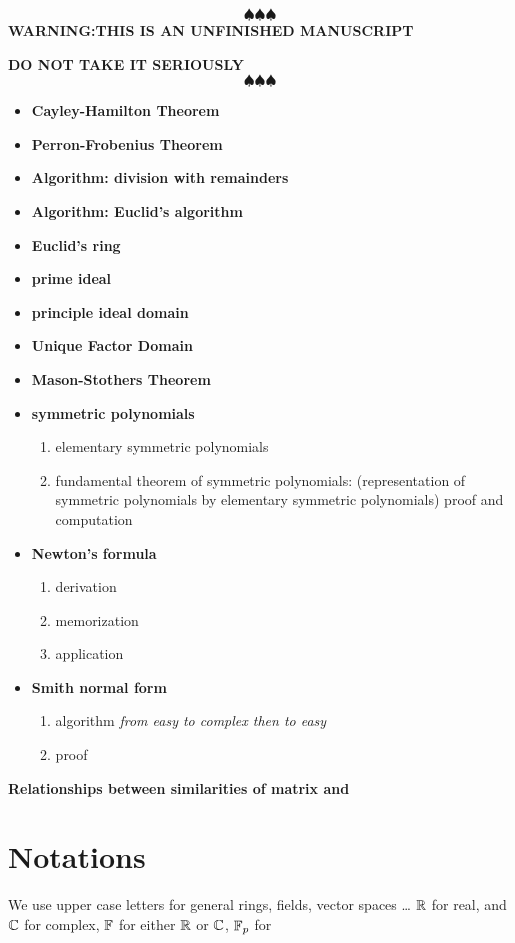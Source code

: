 \documentclass{book}
\begin{document}
\[\spadesuit\spadesuit\spadesuit\]
\textbf{WARNING:THIS IS AN UNFINISHED MANUSCRIPT}\par
\textbf{DO NOT TAKE IT SERIOUSLY}
\[\spadesuit\spadesuit\spadesuit\]
\begin{itemize}
\item \textbf{Cayley-Hamilton Theorem}
\item \textbf{Perron-Frobenius Theorem}
\item \textbf{Algorithm: division with remainders}
\item \textbf{Algorithm: Euclid's algorithm}
\item \textbf{Euclid's ring}
\item \textbf{prime ideal}
\item \textbf{principle ideal domain}
\item \textbf{Unique Factor Domain}
\item \textbf{Mason-Stothers Theorem} 
\item \textbf{symmetric polynomials}
\begin{enumerate}
    \item elementary symmetric polynomials
    \item fundamental theorem of symmetric polynomials: (representation of symmetric polynomials by elementary symmetric polynomials) proof and computation
\end{enumerate}
\item \textbf{Newton's formula} 
\begin{enumerate}
    \item derivation
    \item memorization
    \item application
\end{enumerate}
\item \textbf{Smith normal form} 
\begin{enumerate}
    \item algorithm \textit{from easy to complex then to easy}
    \item proof
\end{enumerate}
\end{itemize}
\textbf{Relationships between similarities of matrix and }

\section{Notations}

We use upper case letters for general rings, fields, vector spaces \dots
$\mathbb{R}$ for real, and $\mathbb{C}$ for complex, $\mathbb{F}$ for either $\mathbb{R}$ or $\mathbb{C}$, $\mathbb{F}_p$ for 








%



\end{document}
